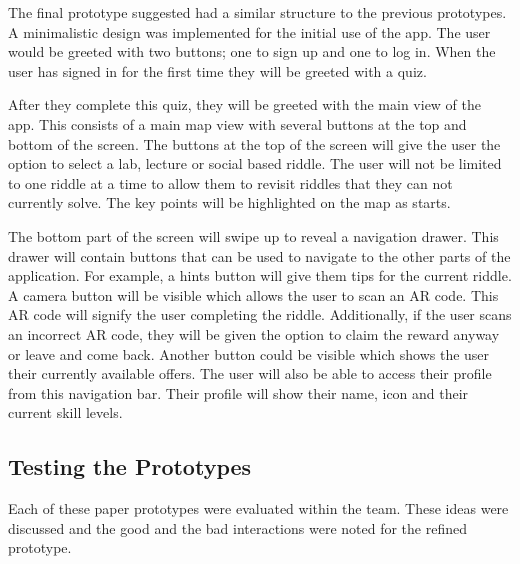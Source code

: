 \documentclass[10pt,twocolumn]{article} %
\begin{document}
The final prototype suggested had a similar structure to the previous prototypes. A minimalistic design was implemented for the initial use of the app. The user would be greeted with two buttons; one to sign up and one to log in. When the user has signed in for the first time they will be greeted with a quiz.

After they complete this quiz, they will be greeted with the main view of the app. This consists of a main map view with several buttons at the top and bottom of the screen. The buttons at the top of the screen will give the user the option to select a lab, lecture or social based riddle. The user will not be limited to one riddle at a time to allow them to revisit riddles that they can not currently solve. The key points will be highlighted on the map as starts.

The bottom part of the screen will swipe up to reveal a navigation drawer. This drawer will contain buttons that can be used to navigate to the other parts of the application. For example, a hints button will give them tips for the current riddle. A camera button will be visible which allows the user to scan an AR code. This AR code will signify the user completing the riddle. Additionally, if the user scans an incorrect AR code, they will be given the option to claim the reward anyway or leave and come back. Another button could be visible which shows the user their currently available offers. The user will also be able to access their profile from this navigation bar. Their profile will show their name, icon and their current skill levels.

\subsection{Testing the Prototypes}
Each of these paper prototypes were evaluated within the team. These ideas were discussed and the good and the bad interactions were noted for the refined prototype.
\end{document}
